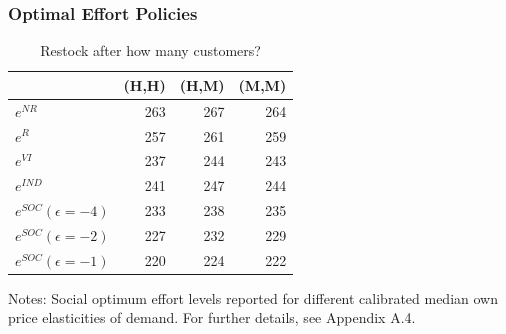 \begin{frame}
\frametitle{Optimal Effort Policies}
\begin{table}[htp]
\caption{Restock after how many customers?}
\begin{center}
\begin{tabular}{|l  r r r| }
\hline
 & (H,H) & (H,M) & (M,M) \\
\hline \hline
$e^{NR}$ & 263 & 267 & 264 \\
$e^{R}$ & 257 & 261 & 259 \\
$e^{VI}$ & 237 & 244 & 243 \\
$e^{IND}$ & 241 & 247 & 244 \\
$e^{SOC} (\epsilon=-4)$ & 233 & 238 & 235 \\
$e^{SOC} (\epsilon=-2)$ & 227 & 232 & 229 \\
$e^{SOC} (\epsilon=-1)$ & 220 & 224 & 222 \\
 \hline
 \end{tabular}
\end{center}
\footnotesize
Notes: Social optimum effort levels reported for different calibrated median own price elasticities of demand. For further details, see Appendix A.4.
\label{tab:policynew}
\end{table}

\end{frame}


